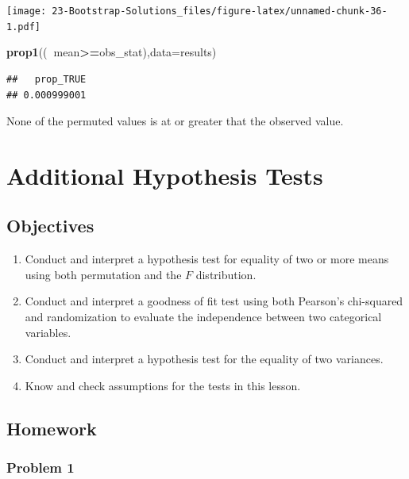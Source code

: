 \documentclass[
]{book}
\newenvironment{Shaded}{\begin{snugshade}}{\end{snugshade}}
\newcommand{\DataTypeTok}[1]{\textcolor[rgb]{0.13,0.29,0.53}{#1}}
\newcommand{\KeywordTok}[1]{\textcolor[rgb]{0.13,0.29,0.53}{\textbf{#1}}}
\newcommand{\NormalTok}[1]{#1}
\newcommand{\OperatorTok}[1]{\textcolor[rgb]{0.81,0.36,0.00}{\textbf{#1}}}
\providecommand{\tightlist}{%
  \setlength{\itemsep}{0pt}\setlength{\parskip}{0pt}}
\begin{document}
\texttt{[image: 23-Bootstrap-Solutions\_files/figure-latex/unnamed-chunk-36-1.pdf]}

\begin{Shaded}
\begin{Highlighting}[]
\KeywordTok{prop1}\NormalTok{((}\OperatorTok{~}\NormalTok{mean}\OperatorTok{>=}\NormalTok{obs_stat),}\DataTypeTok{data=}\NormalTok{results)}
\end{Highlighting}
\end{Shaded}

\begin{verbatim}
##   prop_TRUE 
## 0.000999001
\end{verbatim}

None of the permuted values is at or greater that the observed value.

\hypertarget{ADDTESTS}{%
\chapter{Additional Hypothesis Tests}\label{ADDTESTS}}

\hypertarget{objectives-22}{%
\section{Objectives}\label{objectives-22}}

\begin{enumerate}
\def\labelenumi{\arabic{enumi})}
\tightlist
\item
  Conduct and interpret a hypothesis test for equality of two or more means using both permutation and the \(F\) distribution.\\
\item
  Conduct and interpret a goodness of fit test using both Pearson's chi-squared and randomization to evaluate the independence between two categorical variables.\\
\item
  Conduct and interpret a hypothesis test for the equality of two variances.\\
\item
  Know and check assumptions for the tests in this lesson.
\end{enumerate}

\hypertarget{homework-23}{%
\section{Homework}\label{homework-23}}

\hypertarget{problem-1-23}{%
\subsection{Problem 1}\label{problem-1-23}}
\end{document}
